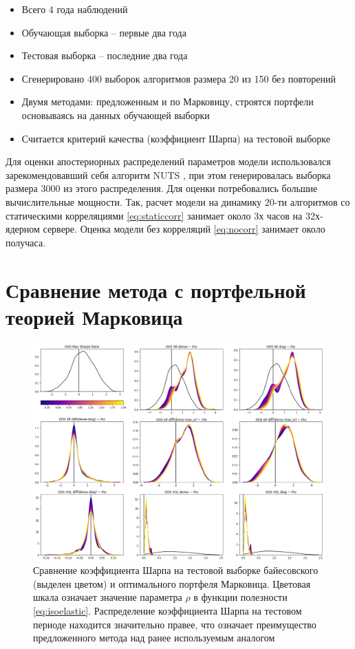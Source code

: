 \begin{itemize}
	\item Всего 4 года наблюдений
	\item Обучающая выборка -- первые два года
	\item Тестовая выборка -- последние два года
	\item Сгенерировано 400 выборок алгоритмов размера 20 из 150 без повторений
	\item Двумя методами: предложенным и по Марковицу, строятся портфели основываясь на данных обучающей выборки
	\item Считается критерий качества (коэффициент Шарпа) на тестовой выборке
\end{itemize}

Для оценки апостериорных распределений параметров модели использовался зарекомендовавший себя алгоритм NUTS \citep{hoffman2011nuts}, при этом генерировалась выборка размера 3000 из этого распределения. Для оценки потребовались большие вычислительные мощности. Так, расчет модели на динамику 20-ти алгоритмов со статическими корреляциями \eqref{eq:staticcorr} занимает около 3х часов на 32х-ядерном сервере. Оценка модели без корреляций \eqref{eq:nocorr} занимает около получаса. 

\section{Сравнение метода с портфельной теорией Марковица}
\begin{figure}[t]
	\centering
	\includegraphics[width=\linewidth]{Thesis/images/performance}
	\caption{Сравнение коэффициента Шарпа на тестовой выборке байесовского (выделен цветом) и оптимального портфеля Марковица. Цветовая шкала означает значение параметра $\rho$ в функции полезности \eqref{eq:isoelastic}. Распределение коэффициента Шарпа на тестовом периоде находится значительно правее, что означает преимущество предложенного метода над ранее используемым аналогом}
	\label{fig:performance}
\end{figure}

